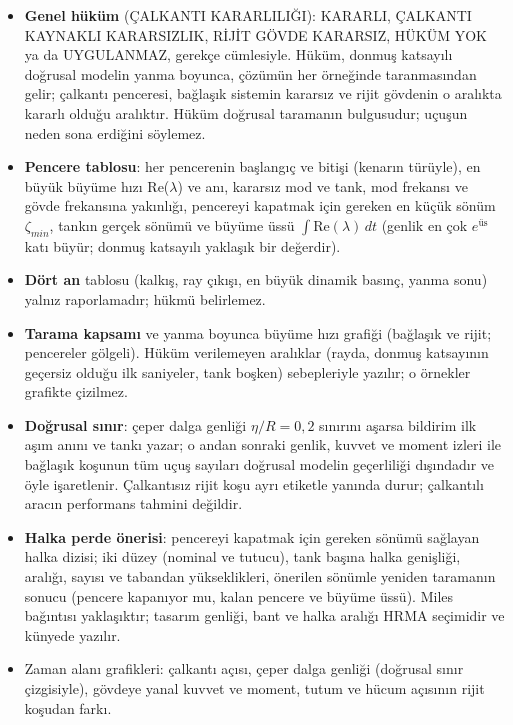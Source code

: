 \documentclass[11pt,a4paper]{article}
\newcommand{\ui}[1]{\textsf{#1}}
\begin{document}
\begin{itemize}[leftmargin=1.4em]
  \item \textbf{Genel hüküm} (\ui{ÇALKANTI KARARLILIĞI}): \ui{KARARLI},
  \ui{ÇALKANTI KAYNAKLI KARARSIZLIK}, \ui{RİJİT GÖVDE KARARSIZ}, \ui{HÜKÜM YOK}
  ya da \ui{UYGULANMAZ}, gerekçe cümlesiyle. Hüküm, donmuş katsayılı doğrusal
  modelin yanma boyunca, çözümün her örneğinde taranmasından gelir; çalkantı
  penceresi, bağlaşık sistemin kararsız ve rijit gövdenin o aralıkta kararlı
  olduğu aralıktır. Hüküm doğrusal taramanın bulgusudur; uçuşun neden sona
  erdiğini söylemez.
  \item \textbf{Pencere tablosu}: her pencerenin başlangıç ve bitişi (kenarın
  türüyle), en büyük büyüme hızı Re($\lambda$) ve anı, kararsız mod ve tank,
  mod frekansı ve gövde frekansına yakınlığı, pencereyi kapatmak için gereken
  en küçük sönüm $\zeta_{min}$, tankın gerçek sönümü ve büyüme üssü
  $\int \mathrm{Re}(\lambda)\,dt$ (genlik en çok $e^{\text{üs}}$ katı büyür;
  donmuş katsayılı yaklaşık bir değerdir).
  \item \textbf{Dört an} tablosu (kalkış, ray çıkışı, en büyük dinamik basınç,
  yanma sonu) yalnız raporlamadır; hükmü belirlemez.
  \item \textbf{Tarama kapsamı} ve yanma boyunca büyüme hızı grafiği
  (bağlaşık ve rijit; pencereler gölgeli). Hüküm verilemeyen aralıklar (rayda,
  donmuş katsayının geçersiz olduğu ilk saniyeler, tank boşken) sebepleriyle
  yazılır; o örnekler grafikte çizilmez.
  \item \textbf{Doğrusal sınır}: çeper dalga genliği $\eta/R = 0{,}2$ sınırını
  aşarsa bildirim ilk aşım anını ve tankı yazar; o andan sonraki genlik,
  kuvvet ve moment izleri ile bağlaşık koşunun tüm uçuş sayıları doğrusal
  modelin geçerliliği dışındadır ve öyle işaretlenir. Çalkantısız rijit koşu
  ayrı etiketle yanında durur; çalkantılı aracın performans tahmini değildir.
  \item \textbf{Halka perde önerisi}: pencereyi kapatmak için gereken sönümü
  sağlayan halka dizisi; iki düzey (nominal ve tutucu), tank başına halka
  genişliği, aralığı, sayısı ve tabandan yükseklikleri, önerilen sönümle
  yeniden taramanın sonucu (pencere kapanıyor mu, kalan pencere ve büyüme
  üssü). Miles bağıntısı yaklaşıktır; tasarım genliği, bant ve halka aralığı
  HRMA seçimidir ve künyede yazılır.
  \item Zaman alanı grafikleri: çalkantı açısı, çeper dalga genliği (doğrusal
  sınır çizgisiyle), gövdeye yanal kuvvet ve moment, tutum ve hücum açısının
  rijit koşudan farkı.
\end{itemize}
\end{document}
